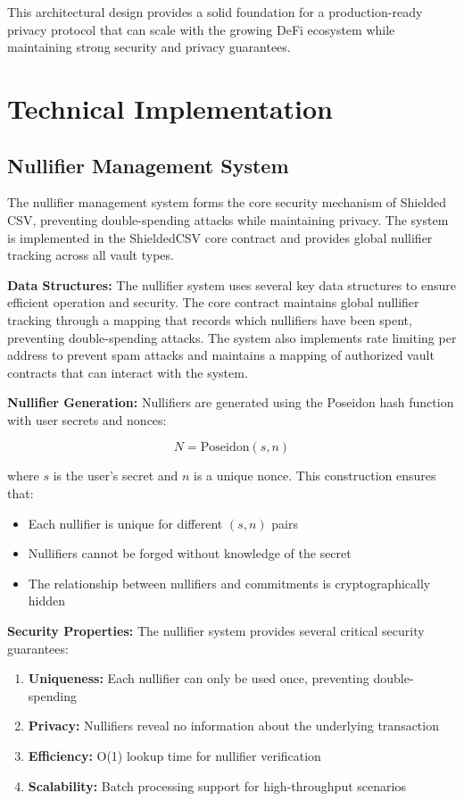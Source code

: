 \documentclass[11pt,a4paper]{article}
\begin{document}
This architectural design provides a solid foundation for a production-ready privacy protocol that can scale with the growing DeFi ecosystem while maintaining strong security and privacy guarantees.

\section{Technical Implementation}

\subsection{Nullifier Management System}

The nullifier management system forms the core security mechanism of Shielded CSV, preventing double-spending attacks while maintaining privacy. The system is implemented in the ShieldedCSV core contract and provides global nullifier tracking across all vault types.

\textbf{Data Structures:}
The nullifier system uses several key data structures to ensure efficient operation and security. The core contract maintains global nullifier tracking through a mapping that records which nullifiers have been spent, preventing double-spending attacks. The system also implements rate limiting per address to prevent spam attacks and maintains a mapping of authorized vault contracts that can interact with the system.

\textbf{Nullifier Generation:}
Nullifiers are generated using the Poseidon hash function with user secrets and nonces:

\begin{equation}
N = \text{Poseidon}(s, n)
\end{equation}

where $s$ is the user's secret and $n$ is a unique nonce. This construction ensures that:
\begin{itemize}
    \item Each nullifier is unique for different $(s, n)$ pairs
    \item Nullifiers cannot be forged without knowledge of the secret
    \item The relationship between nullifiers and commitments is cryptographically hidden
\end{itemize}

\textbf{Security Properties:}
The nullifier system provides several critical security guarantees:

\begin{enumerate}
    \item \textbf{Uniqueness:} Each nullifier can only be used once, preventing double-spending
    \item \textbf{Privacy:} Nullifiers reveal no information about the underlying transaction
    \item \textbf{Efficiency:} O(1) lookup time for nullifier verification
    \item \textbf{Scalability:} Batch processing support for high-throughput scenarios
\end{enumerate}
\end{document}
